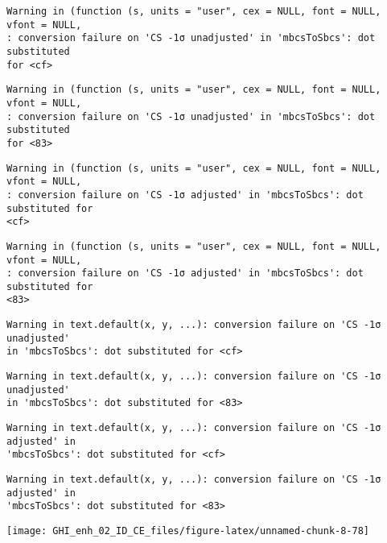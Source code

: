 \documentclass[
  10pt,
  a4paper,oneside]{article}
\begin{document}
\begin{verbatim}
Warning in (function (s, units = "user", cex = NULL, font = NULL, vfont = NULL,
: conversion failure on 'CS -1σ unadjusted' in 'mbcsToSbcs': dot substituted
for <cf>
\end{verbatim}

\begin{verbatim}
Warning in (function (s, units = "user", cex = NULL, font = NULL, vfont = NULL,
: conversion failure on 'CS -1σ unadjusted' in 'mbcsToSbcs': dot substituted
for <83>
\end{verbatim}

\begin{verbatim}
Warning in (function (s, units = "user", cex = NULL, font = NULL, vfont = NULL,
: conversion failure on 'CS -1σ adjusted' in 'mbcsToSbcs': dot substituted for
<cf>
\end{verbatim}

\begin{verbatim}
Warning in (function (s, units = "user", cex = NULL, font = NULL, vfont = NULL,
: conversion failure on 'CS -1σ adjusted' in 'mbcsToSbcs': dot substituted for
<83>
\end{verbatim}

\begin{verbatim}
Warning in text.default(x, y, ...): conversion failure on 'CS -1σ unadjusted'
in 'mbcsToSbcs': dot substituted for <cf>
\end{verbatim}

\begin{verbatim}
Warning in text.default(x, y, ...): conversion failure on 'CS -1σ unadjusted'
in 'mbcsToSbcs': dot substituted for <83>
\end{verbatim}

\begin{verbatim}
Warning in text.default(x, y, ...): conversion failure on 'CS -1σ adjusted' in
'mbcsToSbcs': dot substituted for <cf>
\end{verbatim}

\begin{verbatim}
Warning in text.default(x, y, ...): conversion failure on 'CS -1σ adjusted' in
'mbcsToSbcs': dot substituted for <83>
\end{verbatim}

\begin{center}\texttt{[image: GHI\_enh\_02\_ID\_CE\_files/figure-latex/unnamed-chunk-8-78]} \end{center}
\end{document}
